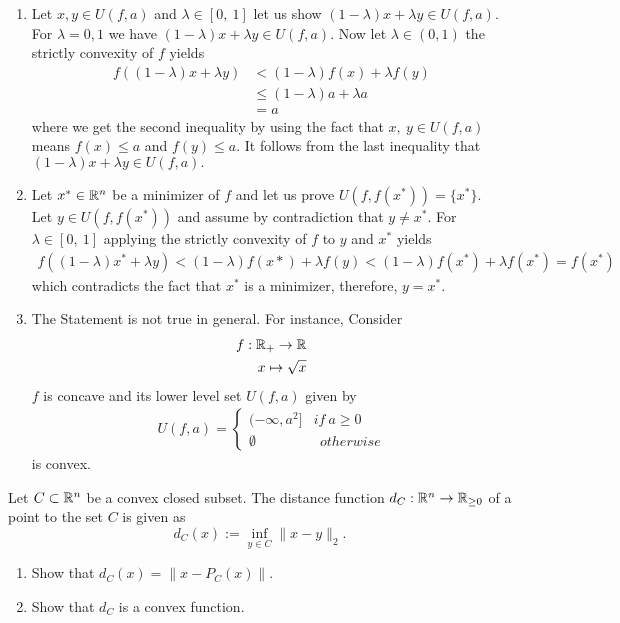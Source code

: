 \documentclass{ExerciseSheet}
\begin{document}
\begin{solution}
\begin{enumerate}
    \item Let $x,y\in  U(f,a)$ and $\lambda\in [0,~1]$ let us show $(1-\lambda)x+\lambda y\in  U(f,a).$\\
    For $\lambda=0,1$ we have  $(1-\lambda)x+\lambda y\in  U(f,a).$ 
  Now let $\lambda\in (0,1)$ the strictly convexity of $f$ yields
  \begin{align*}
      f( (1-\lambda)x+\lambda y) &< (1-\lambda)f(x)                                 +\lambda f(y)\\
                                &\leq(1-\lambda)a+\lambda a\\
                                &=a
  \end{align*}
where we get the second inequality by using the fact that $x,~y\in U(f,a)$ means $f(x)\leq a$ and $f(y)\leq a.$ It follows from the last inequality that $(1-\lambda)x+\lambda y\in U(f,a).$
 \item Let $x^*\in\mathbb{R}^n$ be a minimizer of $f$ and let us prove $U\left(f,f(x^*)\right)=\{x^*\}.$\\
 Let $y\in U\left(f,f(x^*)\right)$ and assume by contradiction that $y\neq x^*.$ For $\lambda\in [0,~1]$ applying the strictly convexity of $f$ to $y$ and $x^*$ yields  
   \begin{align*}
       f( (1-\lambda)x^*+\lambda y) < (1-\lambda)f(x*) +\lambda f(y)< (1-\lambda)f(x^*) +\lambda f(x^*)=f(x^*)
   \end{align*}
   which contradicts the fact that $x^*$ is a minimizer, therefore, $y=x^*.$ 
 \item The Statement is not true in general. For instance,
 Consider \begin{align*}
         f: \mathbb{R}_+\to \mathbb{R}\\
         x \mapsto \sqrt{x}
 \end{align*}
  $f$ is concave and its lower level set $U(f,a)$ given by
    \begin{align*}
        U(f,a)=\begin{cases}
            (-\infty, a^2] &if ~a\geq 0\\
            \emptyset    &~~otherwise
        \end{cases}
    \end{align*}
    is convex.
\end{enumerate}
\end{solution}

\fi
\vskip 0.5cm
\begin{problem}Let $C\subset \mathbb{R}^n$ be a convex closed subset. The distance function $d_C:\mathbb{R}^n\rightarrow \mathbb{R}_{\geq 0}$ of a point to the set $C$ is given as 
\begin{equation*}
    d_C(x):=\inf_{y\in C} \|x-y\|_2.
\end{equation*}
\begin{enumerate}
    \item Show that $d_C(x)= \|x-P_C(x)\|$.
    \item Show that $d_C$ is a convex function. 
\end{enumerate}
\end{problem}
\end{document}
